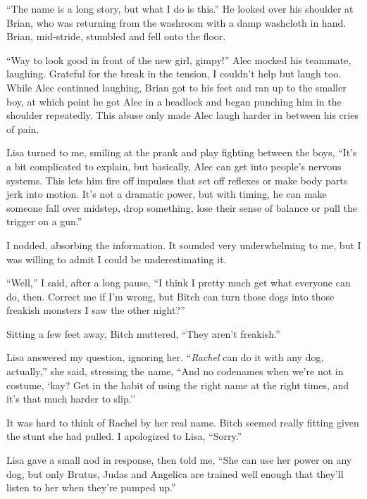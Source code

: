 ``The name is a long story, but what I do is this.''  He looked over his shoulder at Brian, who was returning from the washroom with a damp washcloth in hand.  Brian, mid-stride, stumbled and fell onto the floor.



``Way to look good in front of the new girl, gimpy!'' Alec mocked his teammate, laughing. Grateful for the break in the tension, I couldn't help but laugh too.  While Alec continued laughing, Brian got to his feet and ran up to the smaller boy, at which point he got Alec in a headlock and began punching him in the shoulder repeatedly.  This abuse only made Alec laugh harder in between his cries of pain.



Lisa turned to me, smiling at the prank and play fighting between the boys, ``It's a bit complicated to explain, but basically, Alec can get into people's nervous systems.  This lets him fire off impulses that set off reflexes or make body parts jerk into motion.  It's not a dramatic power, but with timing, he can make someone fall over midstep, drop something, lose their sense of balance or pull the trigger on a gun.''



I nodded, absorbing the information.  It sounded very underwhelming to me, but I was willing to admit I could be underestimating it.



``Well,'' I said, after a long pause, ``I think I pretty much get what everyone can do, then.  Correct me if I'm wrong, but Bitch can turn those dogs into those freakish monsters I saw the other night?''



Sitting a few feet away, Bitch muttered, ``They aren't freakish.''



Lisa answered my question, ignoring her. ``\emph{Rachel} can do it with any dog, actually,'' she said, stressing the name, ``And no codenames when we're not in costume, `kay?  Get in the habit of using the right name at the right times, and it's that much harder to slip.''



It was hard to think of Rachel by her real name.  Bitch seemed really fitting given the stunt she had pulled.  I apologized to Lisa, ``Sorry.''



Lisa gave a small nod in response, then told me, ``She can use her power on any dog, but only Brutus, Judas and Angelica are trained well enough that they'll listen to her when they're pumped up.''



